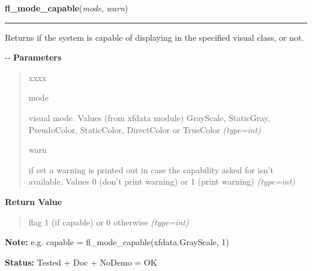 \hspace{.8\funcindent}\begin{boxedminipage}{\funcwidth}

    \raggedright \textbf{fl\_mode\_capable}(\textit{mode}, \textit{warn})

    \vspace{-1.5ex}

    \rule{\textwidth}{0.5\fboxrule}
\setlength{\parskip}{2ex}

Returns if the system is capable of displaying in the specified visual
class, or not.

-{}-
\setlength{\parskip}{1ex}
      \textbf{Parameters}
      \vspace{-1ex}

      \begin{quote}
        \begin{Ventry}{xxxx}

          \item[mode]


visual mode. Values (from xfdata module) GrayScale, StaticGray,
PseudoColor, StaticColor, DirectColor or TrueColor
            {\it (type=int)}

          \item[warn]


if set a warning is printed out in case the capability asked for
isn't available. Values 0 (don't print warning) or 1 (print warning)
            {\it (type=int)}

        \end{Ventry}

      \end{quote}

      \textbf{Return Value}
    \vspace{-1ex}

      \begin{quote}

flag 1 (if capable) or 0 otherwise
      {\it (type=int)}

      \end{quote}

\textbf{Note:} 
e.g. capable = fl\_mode\_capable(xfdata.GrayScale, 1)


\textbf{Status:} 
Tested + Doc + NoDemo = OK


    \end{boxedminipage}

    \label{xformslib:flxbasic:fl_default_win}

